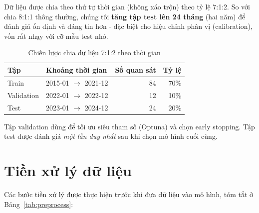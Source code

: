 \documentclass[12pt, a4paper]{report}
\begin{document}
Dữ liệu được chia theo thứ tự thời gian (không xáo trộn) theo tỷ lệ 7:1:2. So với chia 8:1:1 thông thường, chúng tôi \textbf{tăng tập test lên 24 tháng} (hai năm) để đánh giá ổn định và đáng tin hơn - đặc biệt cho hiệu chỉnh phân vị (calibration), vốn rất nhạy với cỡ mẫu test nhỏ.

\begin{table}[H]
\centering
\caption{Chiến lược chia dữ liệu 7:1:2 theo thời gian}
\label{tab:split}
\begin{tabular}{|l|l|r|r|}
\hline
Tập & Khoảng thời gian & Số quan sát & Tỷ lệ \\
\hline
Train      & 2015-01 $\to$ 2021-12 & 84  & 70\% \\
Validation & 2022-01 $\to$ 2022-12 & 12  & 10\% \\
Test       & 2023-01 $\to$ 2024-12 & 24  & 20\% \\
\hline
\end{tabular}
\end{table}

Tập validation dùng để tối ưu siêu tham số (Optuna) và chọn early stopping. Tập test được đánh giá \textit{một lần duy nhất} sau khi chọn mô hình cuối cùng.

\section{Tiền xử lý dữ liệu}
\label{sec:preprocess}

Các bước tiền xử lý được thực hiện trước khi đưa dữ liệu vào mô hình, tóm tắt ở Bảng~\ref{tab:preprocess}:
\end{document}
